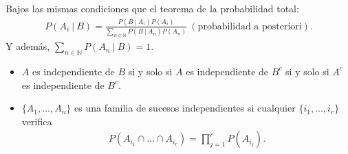 \begin{teo}
Bajos las mismas condiciones que el teorema de la probabilidad total:
\begin{align*}
    P(A_i \ | \ B) = \frac{P(B \ | \ A_i)P(A_i)}{\sum_{n \in \mathbb{N}}{P(B \ | \ A_n)P(A_n)}} \ (\text{probabilidad a posteriori}).
\end{align*}
Y además, $\sum_{n \in \mathbb{N}}{P(A_n \ | \ B)}= 1$.
\end{teo}

\begin{obs}
\begin{itemize}
    \item $A$ es independiente de $B$ si y solo si $A$ es independiente de $B^c$ si y solo si $A^c$ es independiente de $B^c$.
    \item $\{A_1,...,A_n\}$ es una familia de sucesos independientes si cualquier $\{i_1,...,i_r\}$ verifica
    \begin{align*}
        P(A_{i_1} \cap ... \cap A_{i_r}) = \prod_{j=1}^{r}{P(A_{i_j})}.
    \end{align*}
\end{itemize}
\end{obs}